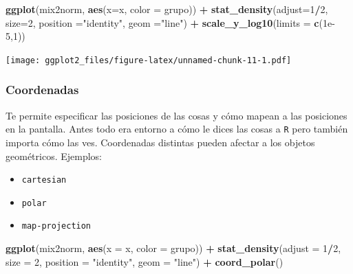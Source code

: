 \documentclass[]{article}
\newenvironment{Shaded}{\begin{snugshade}}{\end{snugshade}}
\newcommand{\KeywordTok}[1]{\textcolor[rgb]{0.13,0.29,0.53}{\textbf{#1}}}
\newcommand{\DataTypeTok}[1]{\textcolor[rgb]{0.13,0.29,0.53}{#1}}
\newcommand{\DecValTok}[1]{\textcolor[rgb]{0.00,0.00,0.81}{#1}}
\newcommand{\FloatTok}[1]{\textcolor[rgb]{0.00,0.00,0.81}{#1}}
\newcommand{\StringTok}[1]{\textcolor[rgb]{0.31,0.60,0.02}{#1}}
\newcommand{\OperatorTok}[1]{\textcolor[rgb]{0.81,0.36,0.00}{\textbf{#1}}}
\newcommand{\NormalTok}[1]{#1}
\providecommand{\tightlist}{%
  \setlength{\itemsep}{0pt}\setlength{\parskip}{0pt}}
\begin{document}
\begin{Shaded}
\begin{Highlighting}[]
\KeywordTok{ggplot}\NormalTok{(mix2norm, }\KeywordTok{aes}\NormalTok{(}\DataTypeTok{x=}\NormalTok{x, }\DataTypeTok{color =}\NormalTok{ grupo)) }\OperatorTok{+}\StringTok{ }
\StringTok{  }\KeywordTok{stat_density}\NormalTok{(}\DataTypeTok{adjust=}\DecValTok{1}\OperatorTok{/}\DecValTok{2}\NormalTok{, }\DataTypeTok{size=}\DecValTok{2}\NormalTok{, }\DataTypeTok{position =}\StringTok{"identity"}\NormalTok{, }\DataTypeTok{geom =}\StringTok{"line"}\NormalTok{) }\OperatorTok{+}
\StringTok{  }\KeywordTok{scale_y_log10}\NormalTok{(}\DataTypeTok{limits =} \KeywordTok{c}\NormalTok{(}\FloatTok{1e-5}\NormalTok{,}\DecValTok{1}\NormalTok{))}
\end{Highlighting}
\end{Shaded}

\texttt{[image: ggplot2\_files/figure-latex/unnamed-chunk-11-1.pdf]}

\subsubsection{Coordenadas}\label{coordenadas}

Te permite especificar las posiciones de las cosas y cómo mapean a las
posiciones en la pantalla. Antes todo era entorno a cómo le dices las
cosas a \texttt{R} pero también importa cómo las ves. Coordenadas
distintas pueden afectar a los objetos geométricos. Ejemplos:

\begin{itemize}
\tightlist
\item
  \texttt{cartesian}
\item
  \texttt{polar}
\item
  \texttt{map-projection}
\end{itemize}

\begin{Shaded}
\begin{Highlighting}[]
\KeywordTok{ggplot}\NormalTok{(mix2norm, }\KeywordTok{aes}\NormalTok{(}\DataTypeTok{x =}\NormalTok{ x, }\DataTypeTok{color =}\NormalTok{ grupo)) }\OperatorTok{+}\StringTok{ }
\StringTok{  }\KeywordTok{stat_density}\NormalTok{(}\DataTypeTok{adjust =} \DecValTok{1}\OperatorTok{/}\DecValTok{2}\NormalTok{, }\DataTypeTok{size =} \DecValTok{2}\NormalTok{, }\DataTypeTok{position =} \StringTok{"identity"}\NormalTok{, }\DataTypeTok{geom =} \StringTok{"line"}\NormalTok{) }\OperatorTok{+}
\StringTok{  }\KeywordTok{coord_polar}\NormalTok{()}
\end{Highlighting}
\end{Shaded}
\end{document}
